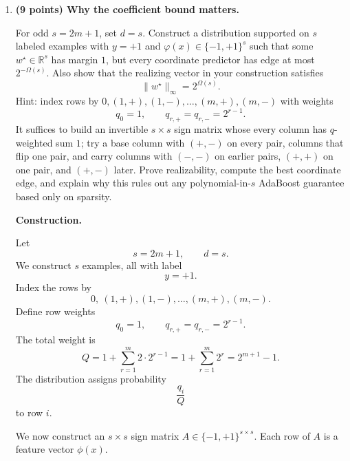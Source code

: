 \documentclass[11pt]{article}
\begin{document}
\begin{enumerate}
\begin{solutionbox}
    \medskip

    \textbf{Role of $B$.}

    The coefficient bound $B$ controls the $\ell_1$ norm:
    \[
    \|w^\star\|_1\le sB.
    \]
    The weak edge is really controlled by the $\ell_1$-normalized margin:
    \[
    \gamma=\frac{1}{2\|w^\star\|_1}.
    \]
    Bounding $\|w^\star\|_\infty$ by $B$ converts this into a polynomial lower bound
    \[
    \gamma\ge \frac{1}{2sB}.
    \]
    Without such a coefficient bound, the realizing sparse vector could have exponentially large
    coefficients, the $\ell_1$ margin could be exponentially small, and AdaBoost could require
    exponentially many rounds.
    \end{solutionbox}

    \item \textbf{(9 points) Why the coefficient bound matters.}

    For odd $s=2m+1$, set $d=s$. Construct a distribution supported on $s$ labeled examples with
    $y=+1$ and $\varphi(x)\in\{-1,+1\}^s$ such that some $w^\star\in\mathbb R^s$ has margin $1$, but every coordinate predictor has edge at most $2^{-\Omega(s)}$. Also show that the realizing vector in your construction satisfies
    \[
    \|w^\star\|_\infty=2^{\Omega(s)}.
    \]
    Hint: index rows by $0,(1,+),(1,-),\ldots,(m,+),(m,-)$ with weights
    \[
    q_0=1,\qquad q_{r,+}=q_{r,-}=2^{r-1}.
    \]
    It suffices to build an invertible $s\times s$ sign matrix whose every column has $q$-weighted sum $1$; try a base column with $(+,-)$ on every pair, columns that flip one pair, and carry columns with $(-,-)$ on earlier pairs, $(+,+)$ on one pair, and $(+,-)$ later. Prove realizability, compute the best coordinate edge, and explain why this rules out any polynomial-in-$s$ AdaBoost guarantee based only on sparsity.

    \begin{solutionbox}
    \textbf{Construction.}

    Let
    \[
    s=2m+1,
    \qquad
    d=s.
    \]
    We construct $s$ examples, all with label
    \[
    y=+1.
    \]
    Index the rows by
    \[
    0,\ (1,+),(1,-),\ldots,(m,+),(m,-).
    \]
    Define row weights
    \[
    q_0=1,
    \qquad
    q_{r,+}=q_{r,-}=2^{r-1}.
    \]
    The total weight is
    \[
    Q
    =
    1+\sum_{r=1}^m2\cdot 2^{r-1}
    =
    1+\sum_{r=1}^m2^r
    =
    2^{m+1}-1.
    \]
    The distribution assigns probability
    \[
    \frac{q_i}{Q}
    \]
    to row $i$.

    We now construct an $s\times s$ sign matrix $A\in\{-1,+1\}^{s\times s}$. Each row of $A$ is
    a feature vector $\phi(x)$.


\end{solutionbox}
\end{enumerate}
\end{document}
